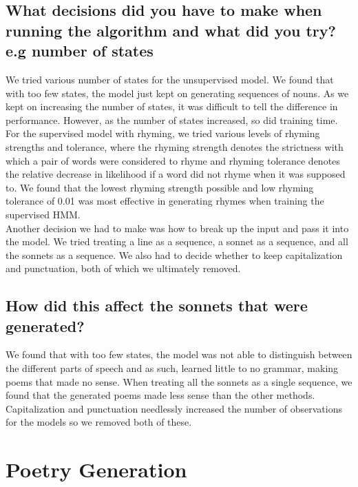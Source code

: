 \subsection{What decisions did you have to make when running the algorithm and what did you try? e.g number of states}
We tried various number of states for the unsupervised model. We found that with too few states, the model just kept on generating sequences of nouns. As we kept on increasing the number of states, it was difficult to tell the difference in performance. However, as the number of states increased, so did training time. \\
\indent For the supervised model with rhyming, we tried various levels of rhyming strengths and tolerance, where the rhyming strength denotes the strictness with which a pair of words were considered to rhyme and rhyming tolerance denotes the relative decrease in likelihood if a word did not rhyme when it was supposed to. We found that the lowest rhyming strength possible and low rhyming tolerance of 0.01 was most effective in generating rhymes when training the supervised HMM. \\
\indent Another decision we had to make was how to break up the input and pass it into the model. We tried treating a line as a sequence, a sonnet as a sequence, and all the sonnets as a sequence. We also had to decide whether to keep capitalization and punctuation, both of which we ultimately removed. 
\subsection{How did this affect the sonnets that were generated?}
We found that with too few states, the model was not able to distinguish between the different parts of speech and as such, learned little to no grammar, making poems that made no sense. When treating all the sonnets as a single sequence, we found that the generated poems made less sense than the other methods. Capitalization and punctuation needlessly increased the number of observations for the models so we removed both of these.

\section{Poetry Generation}
\medskip

